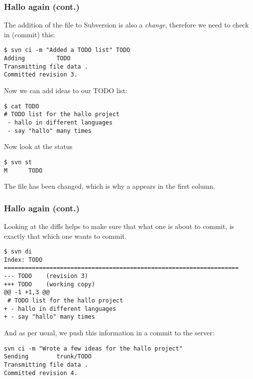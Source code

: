 \begin{frame}[fragile]
    \frametitle{Hallo again (cont.)}
    \linuxframe

    The addition of the file to Subversion is also a \emph{change},
    therefore we need to check in (commit) this:
\begin{lstlisting}[basicstyle=\tiny\ttfamily\color{black}]
$ svn ci -m "Added a TODO list" TODO 
Adding         TODO
Transmitting file data .
Committed revision 3.
\end{lstlisting}

Now we can add ideas to our TODO list:
\begin{lstlisting}[basicstyle=\tiny\ttfamily\color{black}]
$ cat TODO
# TODO list for the hallo project
 - hallo in different languages
 - say "hallo" many times
\end{lstlisting}

Now look at the status
\begin{lstlisting}[basicstyle=\tiny\ttfamily\color{black}]
$ svn st
M      TODO
\end{lstlisting}
The file has been changed, which is why a  appears in the first
column.
\end{frame}

\begin{frame}[fragile]
    \frametitle{Hallo again (cont.)}
    \linuxframe

Looking at the diffs helps to make sure that what one is about to commit, is
exactly that which one wants to commit.
\begin{lstlisting}[basicstyle=\tiny\ttfamily\color{black}]
$ svn di
Index: TODO
===================================================================
--- TODO    (revision 3)
+++ TODO    (working copy)
@@ -1 +1,3 @@
 # TODO list for the hallo project
+ - hallo in different languages
+ - say "hallo" many times
\end{lstlisting}

And as per usual, we push this information in a commit to the server:
\begin{lstlisting}[basicstyle=\tiny\ttfamily\color{black}]
svn ci -m "Wrote a few ideas for the hallo project"
Sending        trunk/TODO
Transmitting file data .
Committed revision 4.
\end{lstlisting}

\end{frame}

